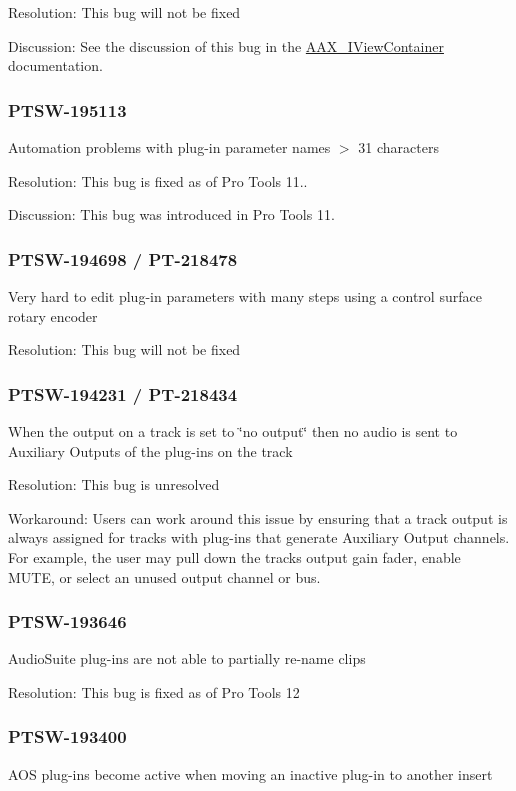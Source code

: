 Resolution\+: This bug will not be fixed

Discussion\+: See the discussion of this bug in the \mbox{\hyperlink{a01889}{A\+A\+X\+\_\+\+I\+View\+Container}} documentation.\hypertarget{a00846_PTSW-195113}{}\subsubsection{P\+T\+S\+W-\/195113}\label{a00846_PTSW-195113}
Automation problems with plug-\/in parameter names $>$ 31 characters

Resolution\+: This bug is fixed as of Pro Tools 11..

Discussion\+: This bug was introduced in Pro Tools 11.\hypertarget{a00846_PTSW-194698}{}\subsubsection{P\+T\+S\+W-\/194698 / P\+T-\/218478}\label{a00846_PTSW-194698}
Very hard to edit plug-\/in parameters with many steps using a control surface rotary encoder

Resolution\+: This bug will not be fixed\hypertarget{a00846_PTSW-194231}{}\subsubsection{P\+T\+S\+W-\/194231 / P\+T-\/218434}\label{a00846_PTSW-194231}
When the output on a track is set to \char`\"{}no output\char`\"{} then no audio is sent to Auxiliary Outputs of the plug-\/ins on the track

Resolution\+: This bug is unresolved

Workaround\+: Users can work around this issue by ensuring that a track output is always assigned for tracks with plug-\/ins that generate Auxiliary Output channels. For example, the user may pull down the track\textquotesingle{}s output gain fader, enable M\+U\+TE, or select an unused output channel or bus.\hypertarget{a00846_PTSW-193646}{}\subsubsection{P\+T\+S\+W-\/193646}\label{a00846_PTSW-193646}
Audio\+Suite plug-\/ins are not able to partially re-\/name clips

Resolution\+: This bug is fixed as of Pro Tools 12\hypertarget{a00846_PTSW-193400}{}\subsubsection{P\+T\+S\+W-\/193400}\label{a00846_PTSW-193400}
A\+OS plug-\/ins become active when moving an inactive plug-\/in to another insert

